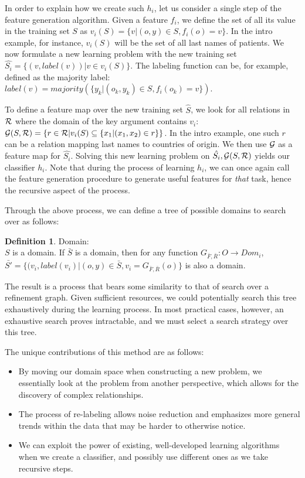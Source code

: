 \documentclass[12pt, a4paper]{article}
\theoremstyle{definition}
\newtheorem{defn}{Definition}[section]
\begin{document}
In order to explain how we create such $h_{i}$, let us consider a single step of the feature generation algorithm.
Given a feature $f_{i}$, we define the set of all its value in the training set $S$ as $v_i(S) = \{v | (o,y) \in S, f_{i}(o)=v\}$. In the intro example, for instance, $v_i(S)$ will be the set of all last names of patients.
We now formulate a new learning problem with the new training set
$\hat{S_i} = \{ (v, label(v)) | v \in v_i(S) \}$.
The labeling function can be, for example, defined as
the majority label: $label(v)=majority(\{y_k| \left(o_k,y_k \right) \in S, f_{i}(o_k)=v\})$.

To define a feature map over the new training set $\hat{S}$, we look for all relations in $\cal R$ where the domain of the key argument contains $v_i$:
${\cal G}(S,{\cal R}) = \left\{ r \in {\cal R} | v_i(S) \subseteq \{x_1 | (x_1,x_2) \in r\}\right\}$. In the intro example, one such $r$ can be a relation mapping last names to countries of origin. We then use ${\cal G}$ as a feature map for $\hat{S_i}$.
Solving this new learning problem on $\hat{S_i}, {\cal G}(S,{\cal R})$ yields our classifier $h_{i}$.
Note that during the process of learning $h_{i}$, we can once again call the feature generation procedure to generate useful features for \emph{that} task, hence the recursive aspect of the process.

Through the above process, we can define a tree of possible domains to search over as follows:
\begin{defn} Domain:\\%
$S$ is a domain.
If $\bar{S}$ is a domain, then for any function $G_{\bar{F},\bar{R}}: O\rightarrow Dom_i$, $\bar{S'}=\{(v_i,label(v_i)|(o,y)\in \bar{S}, v_i=G_{\bar{F},\bar{R}}(o)\}$ is also a domain.
\end{defn}
The result is a process that bears some similarity to that of search over a refinement graph.
Given sufficient resources, we could potentially search this tree exhaustively during the learning process. In most practical cases, however, an exhaustive search proves intractable, and we must select a search strategy over this tree.

The unique contributions of this method are as follows:
\begin{itemize}
    \item By moving our domain space when constructing a new problem, we essentially look at the problem from another perspective, which allows for the discovery of complex relationships.
    \item The process of re-labeling allows noise reduction and emphasizes more general trends within the data that may be harder to otherwise notice.
    \item We can exploit the power of existing, well-developed learning algorithms when we create a classifier, and possibly use different ones as we take recursive steps.
\end{itemize}
\end{document}
